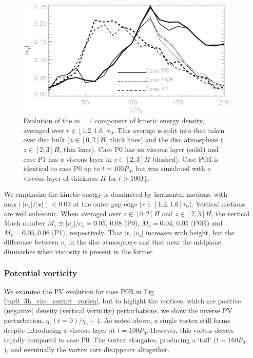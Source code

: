 \begin{figure}
  \centering
  \includegraphics[width=\linewidth]{figures/pdisk_kerz_cases_planet_m1}
  \caption{Evolution of the $m=1$ component of kinetic energy density,
    averaged over $r\in[1.2,1.6]r_0$. This average
    is split into that taken over disc bulk ($z\in[0,2]H$, thick
    lines) and the disc atmosphere ($z\in[2,3]H$, thin lines). Case P0
    has no viscous layer (solid) and case P1 has a viscous layer in
    $z\in[2,3]H$ (dashed). Case P0R is identical to case P0 up to $t=100P_0$,
    but was simulated with a viscous layer of thickness
    $H$ for $t>100P_0$. 
\label{pdisk_kerz_cases_planet}}
\end{figure}

We emphasize the kinetic energy is dominated by horizontal
motions, with $\mathrm{max}(|v_z|/|\bm{v}|) < 0.03$ at the outer
gap edge ($r\in[1.2,1.6]r_0$). Vertical motions are well sub-sonic. When averaged
over $z\in[0,2]H$ and $z\in[2,3]H$, the vertical Mach number
$M_z\equiv|v_z|/c_s=0.05,\,0.08$ (P0), $M_z=0.04,\,0.05$ (P0R) and
$M_z=0.05,0.06$ (P1), respectively. That is, $|v_z|$
increases with height, but the difference between $v_z$ in the disc
atmosphere and that near the midplane diminishes when viscosity is
present in the former. 

\subsubsection{Potential vorticity}
We examine the PV evolution for case P0R in
Fig. \ref{jup0_3h_visc_restart_vorten}, but  
to higlight the vortices, which are positive (negative)
density (vertical vorticity) perturbations, we show the inverse PV
perturbation, $\eta_z(t=0)/\eta_z - 1$. As noted above, a single vortex still forms
despite introducing a viscous layer at $t=100P_0$. However, this
vortex decays rapidly compared to case P0. The vortex elongates, 
producing a `tail' ($t=160P_0$), and eventually the vortex core
disappears altogether.  


